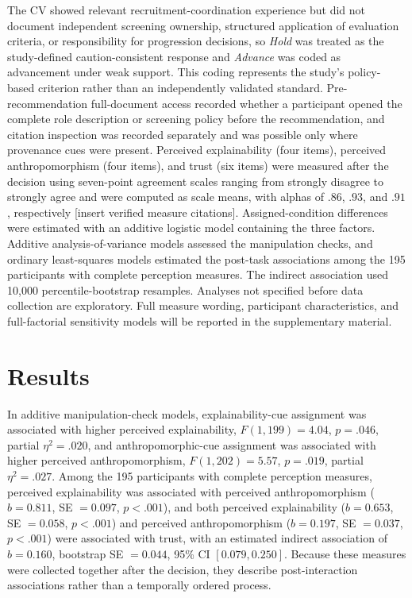 The CV showed relevant recruitment-coordination experience but did not
document independent screening ownership, structured application of
evaluation criteria, or responsibility for progression decisions, so
\emph{Hold} was treated as the study-defined caution-consistent response
and \emph{Advance} was coded as advancement under weak support. This coding
represents the study's policy-based criterion rather than an independently
validated standard. Pre-recommendation full-document access recorded
whether a participant opened the complete role description or screening
policy before the recommendation, and citation inspection was recorded
separately and was possible only where provenance cues were present.
Perceived explainability (four items), perceived anthropomorphism (four
items), and trust (six items) were measured after the decision using
seven-point agreement scales ranging from strongly disagree to strongly
agree and were computed as scale means, with alphas of $.86$, $.93$, and
$.91$, respectively [insert verified measure citations]. Assigned-condition
differences were estimated with an additive logistic model containing the
three factors. Additive analysis-of-variance models assessed the manipulation
checks, and ordinary least-squares models estimated the post-task associations
among the 195 participants with complete perception measures. The indirect
association used 10,000 percentile-bootstrap resamples. Analyses not specified
before data collection are exploratory. Full measure wording, participant
characteristics, and full-factorial sensitivity models will be reported in
the supplementary material.

\section{Results}

In additive manipulation-check models, explainability-cue assignment was
associated with higher perceived explainability, $F(1,199)=4.04$,
$p=.046$, partial $\eta^{2}=.020$, and anthropomorphic-cue assignment was
associated with higher perceived anthropomorphism, $F(1,202)=5.57$,
$p=.019$, partial $\eta^{2}=.027$. Among the 195 participants with complete
perception measures, perceived explainability was associated with perceived
anthropomorphism ($b=0.811$, SE $=0.097$, $p<.001$), and both perceived
explainability ($b=0.653$, SE $=0.058$, $p<.001$) and perceived
anthropomorphism ($b=0.197$, SE $=0.037$, $p<.001$) were associated with
trust, with an estimated indirect association of $b=0.160$, bootstrap
SE $=0.044$, 95\% CI $[0.079, 0.250]$. Because these measures were
collected together after the decision, they describe post-interaction
associations rather than a temporally ordered process.

